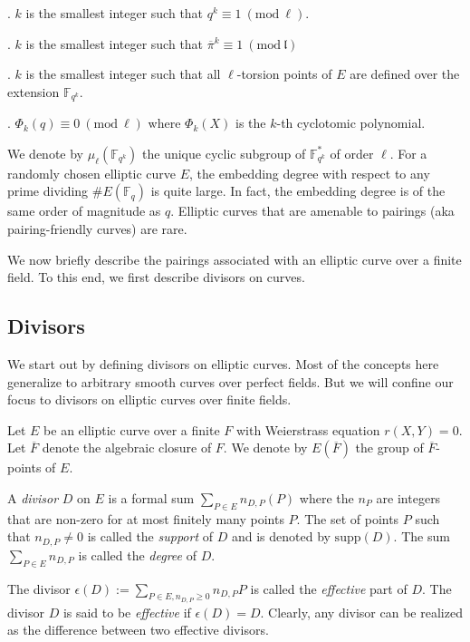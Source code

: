 \documentclass[a4paper, 11pt]{scrreprt}
\numberwithin{equation}{section}
\newcommand{\bF}{\mathbb F}
\newcommand{\bFq}{\mathbb{F}_q}
\newcommand{\bFqk}{\mathbb{F}_{q^k}}
\newcommand{\slim}{\sum\limits}
\newcommand{\mr}{\mathrm}
\newcommand{\mfl}{\mathfrak{l}}
\newcommand{\ov}{\overline}
\newcommand{\noin}{\noindent}
\newcommand{\Mod}[1]{\ (\mathrm{mod}\ #1)}
\theoremstyle{plain}
\begin{document}
\noin 1. $k$ is the smallest integer such that $q^k\equiv 1\Mod{\ell}$.

\noin 2. $k$ is the smallest integer such that $\ov{\pi}^k\equiv 1\Mod{\mfl}$ \vspace{0.5mm}


\noin 3. $k$ is the smallest integer such that all $\ell$-torsion points of $E$ are defined over the extension $\bFqk$. 

\noin 4. $\Phi_k(q)\equiv 0\Mod{\ell}$ where $\Phi_k(X)$ is the $k$-th cyclotomic polynomial.


We denote by $\mu_{\ell}(\bF _{q^k})$ the unique cyclic subgroup of $\bF _{q^k}^*$ of order $\ell$. For a randomly chosen elliptic curve $E$, the embedding degree with respect to any prime dividing $\# E(\bFq)$ is quite large. In fact, the embedding degree is of the same order of magnitude as $q$. Elliptic curves that are amenable to pairings (aka pairing-friendly curves) are rare.

We now briefly describe the pairings associated with an elliptic curve over a finite field. To this end, we first describe divisors on curves.\\ 

\subsection{\fontsize{11}{11}\selectfont Divisors}

We start out by defining divisors on elliptic curves. Most of the concepts here generalize to arbitrary smooth curves over perfect fields. But we will confine our focus to divisors on elliptic curves over finite fields.

Let $E$ be an elliptic curve over a finite $F$ with Weierstrass equation $r(X,Y) = 0$. Let $\ov{F}$ denote the algebraic closure of $F$. We denote by $E(\ov{F})$ the group of $\ov{F}$-points of $E$. 

A \textit{divisor} $D$ on $E$ is a formal sum $\slim_{P\in E}n_{D,P}(P) $ where the $n_P$ are integers that are non-zero for at most finitely many points $P$. The set of points $P$ such that $n_{D,P}\neq 0$ is called the \textit{support} of $D$ and is denoted by $\mr{supp}(D)$. The sum $\slim_{P\in E}n_{D,P}$ is called the \textit{degree} of $D$. 

The divisor $\epsilon(D):= \slim_{P\in E, n_{D,P}\geq 0} n_{D,P}P $ is called the \textit{effective} part of $D$. The divisor $D$ is said to be \textit{effective} if $\epsilon(D) = D$. Clearly, any divisor can be realized as the difference between two effective divisors.
\end{document}
